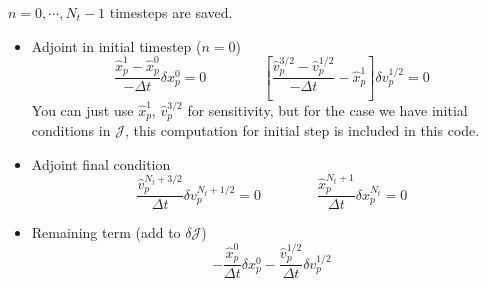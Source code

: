 \documentclass[11pt]{article}
\newcommand{\vp}{v_p}
\newcommand{\xp}{x_p}
\newcommand{\Dt}{\Delta t}
\newcommand{\vph}{\hat{v}_p}
\newcommand{\xph}{\hat{x}_p}
\newcommand{\cJ}{\mathcal{J}}
\begin{document}
$n=0,\cdots,N_t-1$ timesteps are saved.
\begin{itemize}
\item Adjoint in initial timestep ($n=0$)
\begin{equation}
\frac{\xph^1-\xph^0}{-\Dt}\delta \xp^0 = 0\qquad\qquad \left[ \frac{\vph^{3/2} - \vph^{1/2}}{-\Dt} - \xph^1 \right]\delta \vp^{1/2}=0
\end{equation}
You can just use $\xph^1$, $\vph^{3/2}$ for sensitivity,
but for the case we have initial conditions in $\cJ$, this computation for initial step is included in this code.
\item Adjoint final condition
\begin{equation}
\frac{\vph^{N_t+3/2}}{\Dt}\delta v_p^{N_t+1/2} = 0\qquad\qquad\frac{\xph^{N_t+1}}{\Dt}\delta x_p^{N_t} = 0
\end{equation}
\item Remaining term (add to $\delta \cJ$)
\begin{equation}
-\frac{\xph^0}{\Dt}\delta \xp^0 - \frac{\vph^{1/2}}{\Dt}\delta \vp^{1/2}
\end{equation}
\end{itemize}
\end{document}
